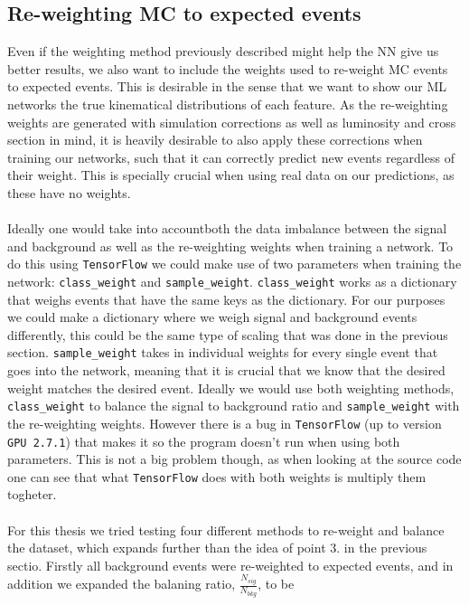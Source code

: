 \documentclass[12pt, a4paper]{book}
\begin{document}
\subsection{Re-weighting MC to expected events}\label{sec:sample_wgts_NN}
Even if the weighting method previously described might help the NN give us better results, we also want to include the weights used to re-weight MC events to expected events. This is desirable in the sense that we want to show our ML networks the true kinematical distributions of each feature.
As the re-weighting weights are generated with simulation corrections as well as luminosity and cross section in mind, it is heavily desirable to also apply these corrections when training our networks, such that it can correctly predict new events regardless of their weight. This is specially 
crucial when using real data on our predictions, as these have no weights.\\
\\Ideally one would take into accountboth  the data imbalance between the signal and background as well as the re-weighting weights when training a network. To do this using \verb|TensorFlow| we could make use of two parameters when training the network: \verb|class_weight| and \verb|sample_weight|. 
\verb|class_weight| works as a dictionary that weighs events that have the same keys as the dictionary. For our purposes we could make a dictionary where we weigh signal and background events differently, this could be the same type of scaling that was done in the previous section. 
\verb|sample_weight| takes in individual weights for every single event that goes into the network, meaning that it is crucial that we know that the desired weight matches the desired event. Ideally we would use both weighting methods, \verb|class_weight| to balance the signal to 
background ratio and \verb|sample_weight| with the re-weighting weights. However there is a bug in \verb|TensorFlow| (up to version \verb|GPU 2.7.1|) that makes it so the program doesn't run when using both parameters. This is not a big problem though, as when looking at the source code \cite{Keras_source_code} 
one can see that what \verb|TensorFlow| does with both weights is multiply them togheter. \\
\\For this thesis we tried testing four different methods to re-weight and balance the dataset, which expands further than the idea of point 3. in the previous sectio. Firstly all background events were re-weighted to expected events, and in addition we expanded the balaning ratio, $\frac{N_{sig}}{N_{bkg}}$, to be
\end{document}
